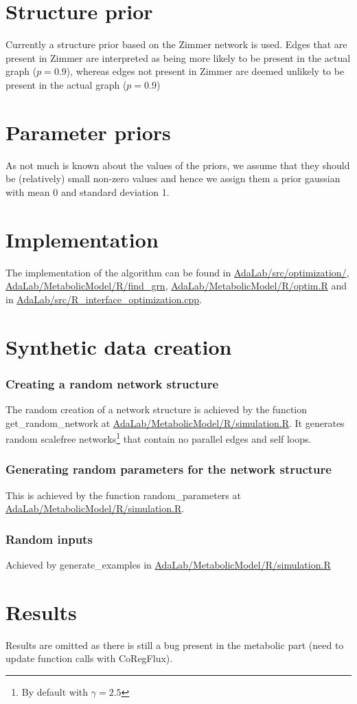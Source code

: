 \section{Structure prior}
Currently a structure prior based on the Zimmer network is used. Edges that are present in Zimmer 
are interpreted as being more likely to be present in the actual graph ($p = 0.9$), whereas edges
not present in Zimmer are deemed unlikely to be present in the actual graph ($p = 0.9$)
\section{Parameter priors}
As not much is known about the values of the priors, we assume that they should be (relatively) small non-zero values 
and hence we assign them a prior gaussian with mean 0 and standard deviation 1.
\section{Implementation}
The implementation of the algorithm can be found in \url{AdaLab/src/optimization/}, 
\url{AdaLab/MetabolicModel/R/find_grn}, \url{AdaLab/MetabolicModel/R/optim.R} and in 
\url{AdaLab/src/R_interface_optimization.cpp}.

\section{Synthetic data creation}
\subsubsection{Creating a random network structure}
The random creation of a network structure is achieved by the function get\_random\_network 
at \url{AdaLab/MetabolicModel/R/simulation.R}. It generates random scalefree networks\footnote{By default
with $\gamma = 2.5$} that contain no parallel edges and self loops. 
\subsubsection{Generating random parameters for the network structure}
This is achieved by the function random\_parameters at \url{AdaLab/MetabolicModel/R/simulation.R}. 
\subsubsection{Random inputs}
Achieved by generate\_examples in \url{AdaLab/MetabolicModel/R/simulation.R}
\section{Results}
Results are omitted as there is still a bug present in the metabolic part (need to update function calls with CoRegFlux).